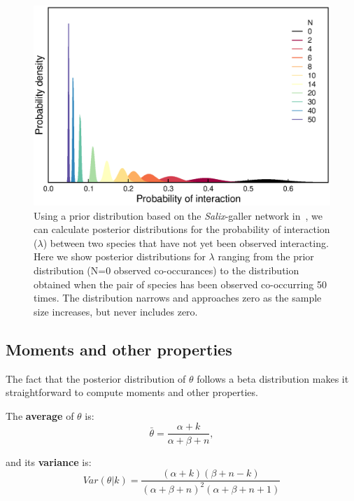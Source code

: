\documentclass[12pt]{article}
\begin{document}
      \begin{figure}[ht]
        \label{Salix_pdfs}
        \caption{Using a prior distribution based on the \emph{Salix}-galler network in~\citet{Barbour2016}, we can calculate posterior distributions for the probability of interaction ($\lambda$) between two species that have not yet been observed interacting. Here we show posterior distributions for $\lambda$ ranging from the prior distribution (N=0 observed co-occurances) to the distribution obtained when the pair of species has been observed co-occurring 50 times. The distribution narrows and approaches zero as the sample size increases, but never includes zero.}
        \includegraphics*[width=.8\textwidth]{figures/Salix_Galler_pdfs_increasing_N.eps}
        \end{figure}


    \subsection*{Moments and other properties}

      The fact that the posterior distribution of $\theta$ follows a beta distribution makes it straightforward to compute moments and other properties. 

      The \textbf{average} of $\theta$ is: 
          \begin{equation}
            \bar{\theta} = \frac{\alpha+k}{\alpha+\beta+n} ,
            \label{mean}
          \end{equation}

        and its \textbf{variance} is:  
          \begin{equation}
            Var(\theta|k) = \frac{(\alpha + k)(\beta + n - k)}{(\alpha + \beta + n)^{2}(\alpha + \beta + n +1)}
            \label{variance}
          \end{equation}
\end{document}
